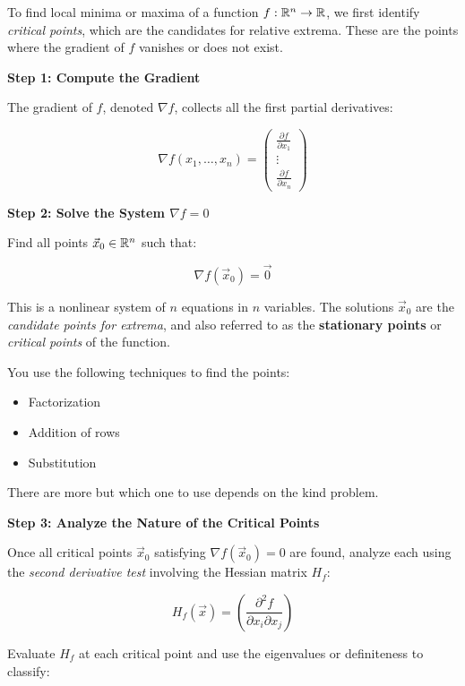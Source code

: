 To find local minima or maxima of a function \( f : \mathbb{R}^n \to \mathbb{R} \), we first identify 
\emph{critical points}, which are the candidates for relative extrema. 
These are the points where the gradient of \(f\) vanishes or does not exist.

\textbf{Step 1: Compute the Gradient}

The gradient of \(f\), denoted \( \nabla f \), collects all the first partial derivatives:

\[
    \nabla f(x_1, \dots, x_n) =
    \begin{pmatrix}
    \frac{\partial f}{\partial x_1} \\
    \vdots \\
    \frac{\partial f}{\partial x_n}
    \end{pmatrix}
\]

\textbf{Step 2: Solve the System \( \nabla f = 0 \)}

Find all points \( \vec{x}_0 \in \mathbb{R}^n \) such that:

\[
    \nabla f(\vec{x}_0) = \vec{0}
\]

This is a nonlinear system of \(n\) equations in \(n\) variables. The solutions \( \vec{x}_0 \) 
are the \emph{candidate points for extrema}, and also referred to as the 
\textbf{stationary points} or \emph{critical points} of the function.

You use the following techniques to find the points: 

\begin{itemize}

    \item Factorization

    \item Addition of rows

    \item Substitution

\end{itemize}

There are more but which one to use depends on the kind problem.

\textbf{Step 3: Analyze the Nature of the Critical Points}

Once all critical points \( \vec{x}_0 \) satisfying \( \nabla f(\vec{x}_0) = 0 \) are found, analyze 
each using the \emph{second derivative test} involving the Hessian matrix \( H_f \):

\[
    H_f(\vec{x}) = \left( \frac{\partial^2 f}{\partial x_i \partial x_j} \right)
\]

Evaluate \( H_f \) at each critical point and use the eigenvalues or definiteness to classify:

